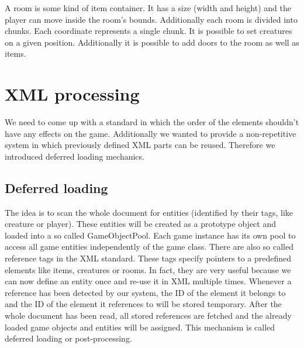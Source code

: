 A room is some kind of item container. It has a size (width and height) and the player can move inside the room's bounds. Additionally each room is divided into chunks. Each coordinate represents a single chunk. It is possible to set creatures on a given position. Additionally it is possible to add doors to the room as well as items.

\section{XML processing}

We need to come up with a standard in which the order of the elements shouldn't have any effects on the game. Additionally we wanted to provide a non-repetitive system in which previously defined XML parts can be reused. Therefore we introduced deferred loading mechanics.

\subsection{Deferred loading}

The idea is to scan the whole document for entities (identified by their tags, like creature or player). These entities will be created as a prototype object and loaded into a so called GameObjectPool. Each game instance has its own pool to access all game entities independently of the game class. There are also so called reference tags in the XML standard. These tags specify pointers to a predefined elements like items, creatures or rooms. In fact, they are very useful because we can now define an entity once and re-use it in XML multiple times. Whenever a reference has been detected by our system, the ID of the element it belongs to and the ID of the element it references to will be stored temporary.
After the whole document has been read, all stored references are fetched and the already loaded game objects and entities will be assigned. This mechanism is called deferred loading or post-processing.